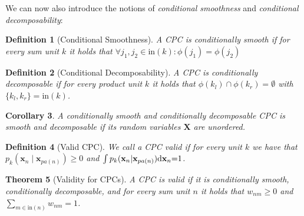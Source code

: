 \documentclass[letterpaper]{article} %
\newtheorem{theorem}{Theorem}[section]
\newtheorem{definition}[theorem]{Definition}
\newtheorem{corollary}[theorem]{Corollary}
\newcommand{\inputs}{\ensuremath{\text{in}}}
\newcommand{\Xvars}{\ensuremath{\mathbf{X}}}
\newcommand{\xvars}{\ensuremath{\mathbf{x}}}
\newcommand{\weight}{\ensuremath{w}}
\newcommand{\scope}{\ensuremath{\phi}}
\newcommand{\parents}{\ensuremath{{pa}}}
\begin{document}
We can now also introduce the notions of \textit{conditional smoothness} and \textit{conditional decomposability}:
\begin{definition}[Conditional Smoothness]
    A CPC is conditionally smooth if for every sum unit $k$ it holds that
    $\forall j_1, j_2 {\in} \inputs(k):  \scope(j_1){=}\scope(j_2) $
\end{definition}

\begin{definition}[Conditional Decomposability]
    A CPC is conditionally decomposable if for every product unit
    $k$ it holds that $\scope (k_l) \cap \scope (k_r) = \emptyset$ with $\{k_l, k_r\}= \inputs (k)$.
\end{definition}



\begin{corollary}
    A conditionally smooth and conditionally decomposable CPC is smooth and decomposable if its random variables $\Xvars$ are unordered.
\end{corollary}

\begin{definition}[Valid CPC]
    \label{def:valid_cpc}
    We call a CPC valid if for every unit $k$ we have that $p_k(\xvars_n {\mid} \xvars_{\parents(n)}){\geq} 0$ and $\int p_k(\xvars_n {\mid} \xvars_{\parents(n)}) \differential \xvars_n{=}1$.
\end{definition}



\begin{theorem}[Validity for CPCs]
    A CPC is valid if it is conditionally smooth, conditionally decomposable, and for every sum unit $n$ it holds that $\weight_{nm}{\geq} 0$ and $\sum_{m\in\inputs(n)} \weight_{nm}{=}1$.
\end{theorem}
\end{document}
